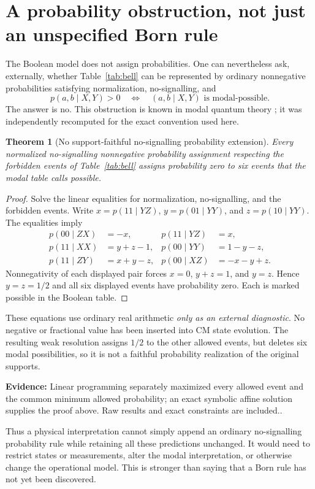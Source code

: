 \documentclass[11pt,a4paper]{article}
\newtheorem{theorem}{Theorem}[section]
\theoremstyle{definition}\newtheorem{definition}[theorem]{Definition}
\newcommand{\ev}[1]{\textbf{Evidence:} #1.}
\begin{document}
\section{A probability obstruction, not just an unspecified Born rule}\label{sec:probability}
The Boolean model does not assign probabilities. One can nevertheless ask, externally, whether Table~\ref{tab:bell} can be represented by ordinary nonnegative probabilities satisfying normalization, no-signalling, and
\[
 p(a,b\mid X,Y)>0\quad\Longleftrightarrow\quad
 (a,b\mid X,Y)\text{ is modal-possible}.
\]
The answer is no. This obstruction is known in modal quantum theory \cite{schumacher2010}; it was independently recomputed for the exact convention used here.

\begin{theorem}[No support-faithful no-signalling probability extension]
Every normalized no-signalling nonnegative probability assignment respecting the forbidden events of Table~\ref{tab:bell} assigns probability zero to six events that the modal table calls possible.
\end{theorem}
\begin{proof}
Solve the linear equalities for normalization, no-signalling, and the forbidden events. Write $x=p(11\mid YZ)$, $y=p(01\mid YY)$, and $z=p(10\mid YY)$. The equalities imply
\begin{align*}
 p(00\mid ZX)&=-x, & p(11\mid YZ)&=x,\\
 p(11\mid XX)&=y+z-1, & p(00\mid YY)&=1-y-z,\\
 p(11\mid ZY)&=x+y-z, & p(00\mid XZ)&=-x-y+z.
\end{align*}
Nonnegativity of each displayed pair forces $x=0$, $y+z=1$, and $y=z$. Hence $y=z=1/2$ and all six displayed events have probability zero. Each is marked possible in the Boolean table.
\end{proof}
These equations use ordinary real arithmetic \emph{only as an external diagnostic}. No negative or fractional value has been inserted into CM state evolution. The resulting weak resolution assigns $1/2$ to the other allowed events, but deletes six modal possibilities, so it is not a faithful probability realization of the original supports.

\ev{Linear programming separately maximized every allowed event and the common minimum allowed probability; an exact symbolic affine solution supplies the proof above. Raw results and exact constraints are included.}

Thus a physical interpretation cannot simply append an ordinary no-signalling probability rule while retaining all these predictions unchanged. It would need to restrict states or measurements, alter the modal interpretation, or otherwise change the operational model. This is stronger than saying that a Born rule has not yet been discovered.
\end{document}
